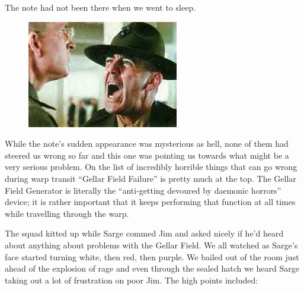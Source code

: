 The note had not been there when we went to sleep. 
 

\begin{figure}
	\begin{center}
		\includegraphics[width=\figwidth]{pics/7/15.png}
	\end{center}
\end{figure}
While the note’s sudden appearance was mysterious as hell, none of them had steered us wrong so far and this one was pointing us towards what might be a very serious problem. 
On the list of incredibly horrible things that can go wrong during warp transit “Gellar Field Failure” is pretty much at the top. 
The Gellar Field Generator is literally the “anti-getting devoured by daemonic horrors” device; 
it is rather important that it keeps performing that function at all times while travelling through the warp.

The squad kitted up while Sarge commed Jim and asked nicely if he’d heard about anything about problems with the Gellar Field. 
We all watched as Sarge’s face started turning white, then red, then purple. 
We bailed out of the room just ahead of the explosion of rage and even through the sealed hatch we heard Sarge taking out a lot of frustration on poor Jim. 
The high points included:








